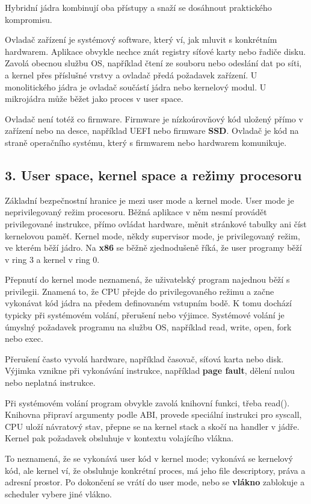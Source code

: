 Hybridní jádra kombinují oba přístupy a snaží se dosáhnout praktického kompromisu.

Ovladač zařízení je systémový software, který ví, jak mluvit s konkrétním hardwarem. Aplikace obvykle nechce znát registry síťové karty nebo řadiče disku. Zavolá obecnou službu OS, například čtení ze souboru nebo odeslání dat po síti, a kernel přes příslušné vrstvy a ovladač předá požadavek zařízení. U monolitického jádra je ovladač součástí jádra nebo kernelový modul. U mikrojádra může běžet jako proces v user space.

Ovladač není totéž co firmware. Firmware je nízkoúrovňový kód uložený přímo v zařízení nebo na desce, například UEFI nebo firmware \textbf{SSD}. Ovladač je kód na straně operačního systému, který s firmwarem nebo hardwarem komunikuje.

\subsection*{3. User space, kernel space a režimy procesoru}

Základní bezpečnostní hranice je mezi user mode a kernel mode. User mode je neprivilegovaný režim procesoru. Běžná aplikace v něm nesmí provádět privilegované instrukce, přímo ovládat hardware, měnit stránkové tabulky ani číst kernelovou paměť. Kernel mode, někdy supervisor mode, je privilegovaný režim, ve kterém běží jádro. Na \textbf{x86} se běžně zjednodušeně říká, že user programy běží v ring 3 a kernel v ring 0.

Přepnutí do kernel mode neznamená, že uživatelský program najednou běží s privilegii. Znamená to, že CPU přejde do privilegovaného režimu a začne vykonávat kód jádra na předem definovaném vstupním bodě. K tomu dochází typicky při systémovém volání, přerušení nebo výjimce. Systémové volání je úmyslný požadavek programu na službu OS, například read, write, open, fork nebo exec.

Přerušení často vyvolá hardware, například časovač, síťová karta nebo disk. Výjimka vznikne při vykonávání instrukce, například \textbf{page fault}, dělení nulou nebo neplatná instrukce.

Při systémovém volání program obvykle zavolá knihovní funkci, třeba read(). Knihovna připraví argumenty podle ABI, provede speciální instrukci pro syscall, CPU uloží návratový stav, přepne se na kernel stack a skočí na handler v jádře. Kernel pak požadavek obsluhuje v kontextu volajícího vlákna.

To neznamená, že se vykonává user kód v kernel mode; vykonává se kernelový kód, ale kernel ví, že obsluhuje konkrétní proces, má jeho file descriptory, práva a adresní prostor. Po dokončení se vrátí do user mode, nebo se \textbf{vlákno} zablokuje a scheduler vybere jiné vlákno.

